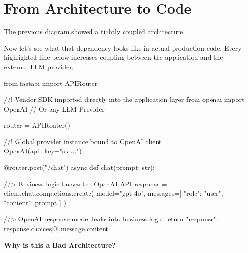 \documentclass[11pt]{article}
\begin{document}
\newpage


\section*{From Architecture to Code}

\vspace{0.2in}

The previous diagram showed a tightly coupled architecture.

Now let's see what that dependency looks like in actual production code. Every highlighted line below increases coupling between the application and the external LLM provider.

\vspace{0.25in}

\begin{codebox}
from fastapi import APIRouter

//! Vendor SDK imported directly into the application layer
from openai import OpenAI // Or any LLM Provider

router = APIRouter()

//! Global provider instance bound to OpenAI
client = OpenAI(api_key="sk-...")

@router.post("/chat")
async def chat(prompt: str):

    //> Business logic knows the OpenAI API
    response = client.chat.completions.create(
        model="gpt-4o",
        messages=[
            {"role": "user", "content": prompt}
        ]
    )

    //> OpenAI response model leaks into business logic
    return {
        "response": response.choices[0].message.content
    }
\end{codebox}

\vspace{0.35in}

\newpage
{\Large\color{brandnavy}\textbf{Why is this a Bad Architecture?}}

\vspace{0.2in}
\end{document}
